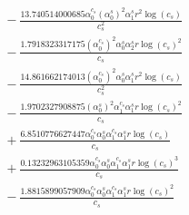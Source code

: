 \documentclass[10pt]{article}
\begin{document}
\begin{align*}
&{}  - \frac{13.740514000685 \alpha_{0}^{c_s} \left(\alpha_{0}^s\right)^{2} \alpha_{1}^s r^{2} \log{\left(c_{s} \right)}}{c_{s}^{2}} \\
&{}  - \frac{1.7918323317175 \left(\alpha_{0}^{c_s}\right)^{2} \alpha_{0}^s \alpha_{2}^s r \log{\left(c_{s} \right)}^{2}}{c_{s}} \\
&{}  - \frac{14.861662174013 \left(\alpha_{0}^{c_s}\right)^{2} \alpha_{0}^s \alpha_{1}^s r^{2} \log{\left(c_{s} \right)}}{c_{s}^{2}} \\
&{}  - \frac{1.9702327908875 \left(\alpha_{0}^s\right)^{2} \alpha_{1}^{c_s} \alpha_{1}^s r \log{\left(c_{s} \right)}^{2}}{c_{s}} \\
&{}  + \frac{6.8510776627447 \alpha_{0}^{c_s} \alpha_{0}^s \alpha_{1}^{c_s} \alpha_{1}^s r \log{\left(c_{s} \right)}}{c_{s}} \\
&{}  + \frac{0.13232963105359 \alpha_{0}^{c_s} \alpha_{0}^s \alpha_{1}^{c_s} \alpha_{1}^s r \log{\left(c_{s} \right)}^{3}}{c_{s}} \\
&{}  - \frac{1.8815899057909 \alpha_{0}^{c_s} \alpha_{0}^s \alpha_{1}^{c_s} \alpha_{1}^s r \log{\left(c_{s} \right)}^{2}}{c_{s}}
\end{align*}
\end{document}
